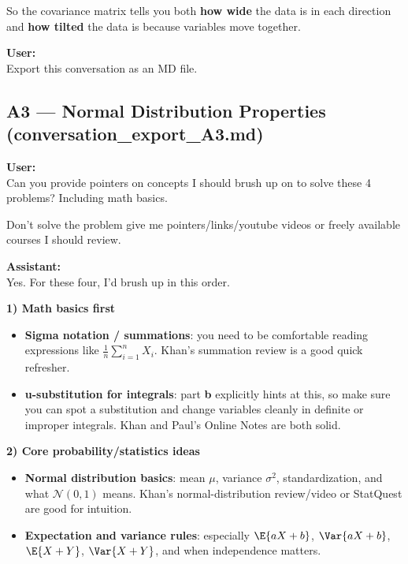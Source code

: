 \documentclass{article}
\begin{document}
\begin{mdframed}
So the covariance matrix tells you both \textbf{how wide} the data is in each direction and \textbf{how tilted} the data is because variables move together.

\bigskip
\textbf{User:} \\
Export this conversation as an MD file.
\end{mdframed}

\subsection*{A3 --- Normal Distribution Properties (conversation\_export\_A3.md)}

\begin{mdframed}
\textbf{User:} \\
Can you provide pointers on concepts I should brush up on to solve these 4 problems? Including math basics.

Don't solve the problem give me pointers/links/youtube videos or freely available courses I should review.

\bigskip
\textbf{Assistant:} \\
Yes. For these four, I'd brush up in this order.

\textbf{1) Math basics first}
\begin{itemize}[leftmargin=*]
    \item \textbf{Sigma notation / summations}: you need to be comfortable reading expressions like $\frac{1}{n}\sum_{i=1}^n X_i$. Khan's summation review is a good quick refresher.
    \item \textbf{u-substitution for integrals}: part \textbf{b} explicitly hints at this, so make sure you can spot a substitution and change variables cleanly in definite or improper integrals. Khan and Paul's Online Notes are both solid.
\end{itemize}

\textbf{2) Core probability/statistics ideas}
\begin{itemize}[leftmargin=*]
    \item \textbf{Normal distribution basics}: mean $\mu$, variance $\sigma^2$, standardization, and what $\mathcal{N}(0,1)$ means. Khan's normal-distribution review/video or StatQuest are good for intuition.
    \item \textbf{Expectation and variance rules}: especially $\E{aX+b}$, $\Var{aX+b}$, $\E{X+Y}$, $\Var{X+Y}$, and when independence matters.
\end{itemize}


\end{mdframed}
\end{document}
